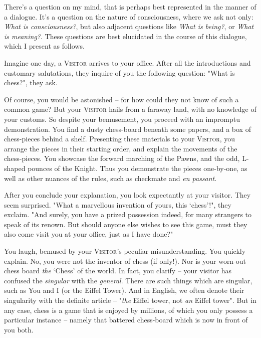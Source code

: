 \noindent
There's a question on my mind, that is perhaps best represented in the manner of a dialogue. It's a question on the nature of consciousness, where we ask not only: \emph{What is consciousness?}, but also adjacent questions like \emph{What is being?}, or \emph{What is meaning?}. These questions are best elucidated in the course of this dialogue, which I present as follows.

Imagine one day, a \textsc{Visitor} arrives to your office. After all the introductions and customary salutations, they inquire of you the following question: "What is chess?", they ask.

Of course, you would be astonished -- for how could they not know of such a common game? But your \textsc{Visitor} hails from a faraway land, with no knowledge of your customs. So despite your bemusement, you proceed with an impromptu demonstration. You find a dusty chess-board beneath some papers, and a box of chess-pieces behind a shelf. Presenting these materials to your \textsc{Visitor}, you arrange the pieces in their starting order, and explain the movements of the chess-pieces. You showcase the forward marching of the Pawns, and the odd, L-shaped pounces of the Knight. Thus you demonstrate the pieces one-by-one, as well as other nuances of the rules, such as checkmate and \emph{en passant}.

After you conclude your explanation, you look expectantly at your visitor. They seem surprised. "What a marvellous invention of yours, this `chess'!", they exclaim. "And surely, you have a prized possession indeed, for many strangers to speak of its renown. But should anyone else wishes to see this game, must they also come visit you at your office, just as I have done?"

You laugh, bemused by your \textsc{Visitor}'s peculiar misunderstanding. You quickly explain. No, you were not the inventor of chess (if only!). Nor is your worn-out chess board \emph{the} `Chess' of the world. In fact, you clarify -- your visitor has confused the \emph{singular} with the \emph{general}. There are such things which are singular, such as You and I (or the Eiffel Tower). And in English, we often denote their singularity with the definite article -- "\emph{the} Eiffel tower, not \emph{an} Eiffel tower". But in any case, chess is a game that is enjoyed by millions, of which you only possess a particular instance -- namely that battered chess-board which is now in front of you both.

